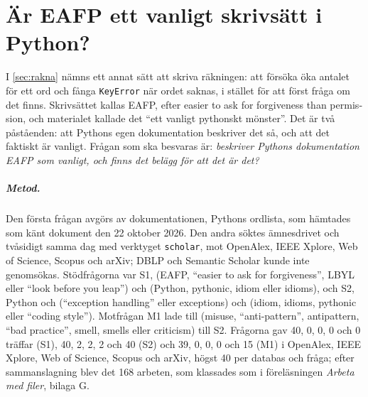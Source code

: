 \chapter{Är EAFP ett vanligt skrivsätt i Python?}
\label{app:eafp}

I \cref{sec:rakna} nämns ett annat sätt att skriva räkningen: att försöka
öka antalet för ett ord och fånga \texttt{KeyError} när ordet
saknas, i stället för att först fråga om det finns.  Skrivsättet kallas
EAFP, efter \foreignlanguage{english}{easier to ask for forgiveness than
permission}, och materialet kallade det \enquote{ett vanligt pythonskt
mönster}.  Det är två påståenden: att Pythons egen dokumentation beskriver
det så, och att det faktiskt är vanligt.  Frågan som ska besvaras är:
\emph{beskriver Pythons dokumentation EAFP som vanligt, och finns det
belägg för att det är det?}

\paragraph{Metod.}  Den första frågan avgörs av dokumentationen, Pythons
ordlista, som hämtades som känt dokument den 22 oktober
2026\autocite{PythonGlossary}.  Den andra söktes ämnesdrivet och
tvåsidigt samma dag med verktyget \texttt{scholar}, mot OpenAlex, IEEE
Xplore, Web of Science, Scopus och arXiv; DBLP och Semantic Scholar
kunde inte genomsökas.  Stödfrågorna var S1, (EAFP, \enquote{easier to
ask for forgiveness}, LBYL eller \enquote{look before you leap}) och
(Python, pythonic, idiom eller idioms), och S2, Python och
(\enquote{exception handling} eller exceptions) och (idiom, idioms,
pythonic eller \enquote{coding style}).  Motfrågan M1 lade till
(misuse, \enquote{anti-pattern}, antipattern, \enquote{bad practice},
smell, smells eller criticism) till S2.  Frågorna gav 40, 0, 0, 0 och 0
träffar (S1), 40, 2, 2, 2 och 40 (S2) och 39, 0, 0, 0 och 15 (M1) i
OpenAlex, IEEE Xplore, Web of Science, Scopus och arXiv, högst 40 per
databas och fråga; efter sammanslagning blev det 168 arbeten, som
klassades som i föreläsningen \emph{Arbeta med filer}, bilaga G.


